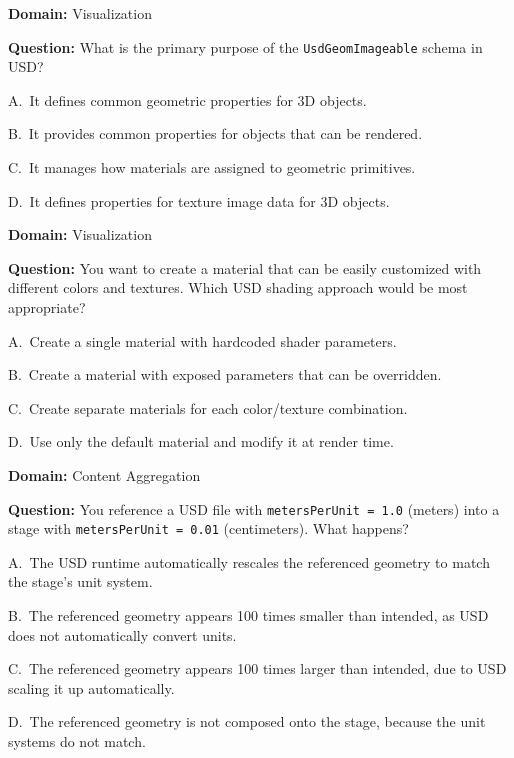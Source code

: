 \noindent\textbf{Domain:} Visualization\par
\vspace{0.4em}
\noindent\textbf{Question:} What is the primary purpose of the \texttt{UsdGeomImageable} schema in USD?
\begin{Choices}
  \item A.\ It defines common geometric properties for 3D objects.
  \item B.\ It provides common properties for objects that can be rendered.
  \item C.\ It manages how materials are assigned to geometric primitives.
  \item D.\ It defines properties for texture image data for 3D objects.
\end{Choices}

\noindent\textbf{Domain:} Visualization\par
\vspace{0.4em}
\noindent\textbf{Question:} You want to create a material that can be easily customized with different colors and textures. Which USD shading approach would be most appropriate?
\begin{Choices}
  \item A.\ Create a single material with hardcoded shader parameters.
  \item B.\ Create a material with exposed parameters that can be overridden.
  \item C.\ Create separate materials for each color/texture combination.
  \item D.\ Use only the default material and modify it at render time.
\end{Choices}

\noindent\textbf{Domain:} Content Aggregation\par
\vspace{0.4em}
\noindent\textbf{Question:} You reference a USD file with \texttt{metersPerUnit = 1.0} (meters) into a stage with \texttt{metersPerUnit = 0.01} (centimeters). What happens?
\begin{Choices}
  \item A.\ The USD runtime automatically rescales the referenced geometry to match the stage’s unit system.
  \item B.\ The referenced geometry appears 100 times smaller than intended, as USD does not automatically convert units.
  \item C.\ The referenced geometry appears 100 times larger than intended, due to USD scaling it up automatically.
  \item D.\ The referenced geometry is not composed onto the stage, because the unit systems do not match.
\end{Choices}

